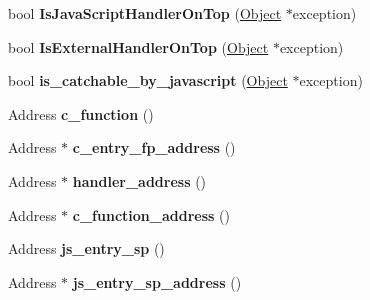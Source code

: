 \begin{DoxyCompactItemize}
\item 
bool {\bfseries Is\+Java\+Script\+Handler\+On\+Top} (\hyperlink{classv8_1_1internal_1_1_object}{Object} $\ast$exception)\hypertarget{classv8_1_1internal_1_1_isolate_a1cbf1cc412a5464776767967522cb42d}{}\label{classv8_1_1internal_1_1_isolate_a1cbf1cc412a5464776767967522cb42d}

\item 
bool {\bfseries Is\+External\+Handler\+On\+Top} (\hyperlink{classv8_1_1internal_1_1_object}{Object} $\ast$exception)\hypertarget{classv8_1_1internal_1_1_isolate_afd38fb488766e36cc73ac8fdf2b59dff}{}\label{classv8_1_1internal_1_1_isolate_afd38fb488766e36cc73ac8fdf2b59dff}

\item 
bool {\bfseries is\+\_\+catchable\+\_\+by\+\_\+javascript} (\hyperlink{classv8_1_1internal_1_1_object}{Object} $\ast$exception)\hypertarget{classv8_1_1internal_1_1_isolate_a327acb0c7a2c9390eef6abc374a6aa05}{}\label{classv8_1_1internal_1_1_isolate_a327acb0c7a2c9390eef6abc374a6aa05}

\item 
Address {\bfseries c\+\_\+function} ()\hypertarget{classv8_1_1internal_1_1_isolate_ae9563da6158eacde1c49fa8a8147d38c}{}\label{classv8_1_1internal_1_1_isolate_ae9563da6158eacde1c49fa8a8147d38c}

\item 
Address $\ast$ {\bfseries c\+\_\+entry\+\_\+fp\+\_\+address} ()\hypertarget{classv8_1_1internal_1_1_isolate_ae9cbe69b7bfa733e978bd2a83b4006a8}{}\label{classv8_1_1internal_1_1_isolate_ae9cbe69b7bfa733e978bd2a83b4006a8}

\item 
Address $\ast$ {\bfseries handler\+\_\+address} ()\hypertarget{classv8_1_1internal_1_1_isolate_ad75476b8c6f76f3bb98257d48e578038}{}\label{classv8_1_1internal_1_1_isolate_ad75476b8c6f76f3bb98257d48e578038}

\item 
Address $\ast$ {\bfseries c\+\_\+function\+\_\+address} ()\hypertarget{classv8_1_1internal_1_1_isolate_a1ff131c9bfa1cf7ff26e7d61eddcdad5}{}\label{classv8_1_1internal_1_1_isolate_a1ff131c9bfa1cf7ff26e7d61eddcdad5}

\item 
Address {\bfseries js\+\_\+entry\+\_\+sp} ()\hypertarget{classv8_1_1internal_1_1_isolate_a845886f051b159999c67dcba918b1154}{}\label{classv8_1_1internal_1_1_isolate_a845886f051b159999c67dcba918b1154}

\item 
Address $\ast$ {\bfseries js\+\_\+entry\+\_\+sp\+\_\+address} ()\hypertarget{classv8_1_1internal_1_1_isolate_a1eb1d6e55ff7cfab3c696e16447fdde9}{}\label{classv8_1_1internal_1_1_isolate_a1eb1d6e55ff7cfab3c696e16447fdde9}


\end{DoxyCompactItemize}
